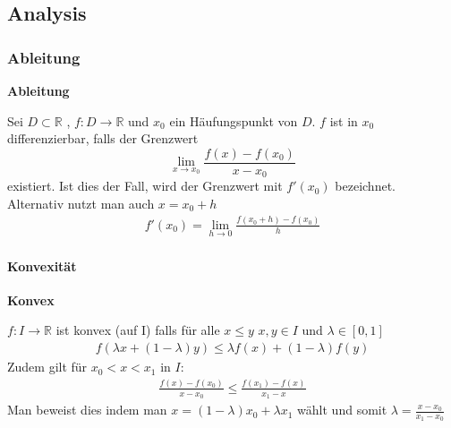 \documentclass[25pt]{sciposter}
\newcommand{\R}{\mathbb{R}}
\newenvironment{method}[1]{\begin{mdframed}[backgroundcolor=blue!10,innertopmargin=15pt, innerbottommargin=15pt,nobreak=true]
		\textbf{#1 }
	}
	{ 
	\end{mdframed}
}
\begin{document}
\begin{multicols}{3}






\part{Analysis}

\section{Ableitung}

\begin{method}{Ableitung}
	Sei $D \subset \R$ , $f:D \to  \R$ und $x_0$ ein Häufungspunkt von $D$. $f$ ist in $x_0$ differenzierbar, falls der Grenzwert 
	$$ \lim\limits_{x \to x_0} \frac{f(x) -f(x_0)}{x-x_0}$$
	existiert. Ist dies der Fall, wird der Grenzwert mit $f'(x_0)$ bezeichnet.\\
	Alternativ nutzt man auch $x = x_0 + h$
	\begin{align*}
			f'(x_0) = \lim\limits_{h \to 0} \frac{f(x_0 + h) - f(x_0)}{h}
	\end{align*}
\end{method}



\subsection*{Konvexität}

\begin{method}{Konvex}
	$f : I \to \R$ ist konvex (auf I) falls für alle $x \leq y$ $x,y \in I$ und $\lambda \in [0,1]$
	\begin{align*}
	f(\lambda x + (1-\lambda)y) \leq \lambda f(x) + (1-\lambda)f(y)
	\end{align*}
	Zudem gilt für $x_0 < x< x_1$ in $I$:
	\begin{align*}
	 \frac{f(x) - f(x_0)}{x-x_0} \leq \frac{f(x_1) - f(x)}{x_1 - x}
	\end{align*}
	Man beweist dies indem man $x = (1-\lambda) x_0 + \lambda x_1$ wählt und somit $\lambda = \frac{x-x_0}{x_1 - x_0}$
\end{method}





\end{multicols}
\end{document}
